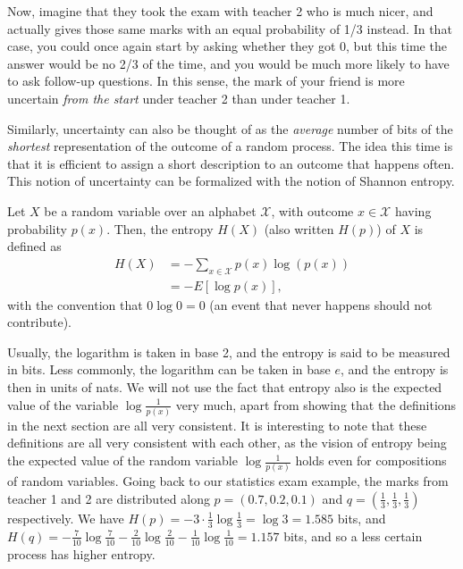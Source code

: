 Now, imagine that they took the exam with teacher 2 who is much nicer, and actually gives those same marks with an equal probability of 1/3 instead. In that case, you could once again start by asking whether they got 0, but this time the answer would be no 2/3 of the time, and you would be much more likely to have to ask follow-up questions. In this sense, the mark of your friend is more uncertain \textit{from the start} under teacher 2 than under teacher 1.

Similarly, uncertainty can also be thought of as the \textit{average} number of bits of the \textit{shortest} representation of the outcome of a random process. The idea this time is that it is efficient to assign a short description to an outcome that happens often. This notion of uncertainty can be formalized with the notion of Shannon entropy.

\begin{definition}
    Let $X$ be a random variable over an alphabet $\mathcal{X}$, with outcome $x \in \mathcal{X}$ having probability $p(x)$. Then, the entropy $H(X)$ (also written $H(p)$) of $X$ is defined as
    \begin{align}
        H(X) &= - \sum_{x \in \mathcal{X}} p(x) \log(p(x)) \\
             &= - E[\log p(x)],
    \end{align}
    with the convention that $0 \log 0 = 0$ (an event that never happens should not contribute).
\end{definition}

Usually, the logarithm is taken in base 2, and the entropy is said to be measured in bits. Less commonly, the logarithm can be taken in base $e$, and the entropy is then in units of nats. We will not use the fact that entropy also is the expected value of the variable $\log \frac{1}{p(x)}$ very much, apart from showing that the definitions in the next section are all very consistent. It is interesting to note that these definitions are all very consistent with each other, as the vision of entropy being the expected value of the random variable $\log \frac{1}{p(x)}$ holds even for compositions of random variables. Going back to our statistics exam example, the marks from teacher 1 and 2 are distributed along $p = (0.7, 0.2, 0.1)$ and $q = \left(\frac{1}{3}, \frac{1}{3}, \frac{1}{3}\right)$ respectively. We have $H(p) = - 3 \cdot \frac{1}{3} \log \frac{1}{3} = \log 3 = 1.585$ bits, and $H(q) = - \frac{7}{10} \log \frac{7}{10} - \frac{2}{10} \log \frac{2}{10} - \frac{1}{10} \log \frac{1}{10} = 1.157$ bits, and so a less certain process has higher entropy.

